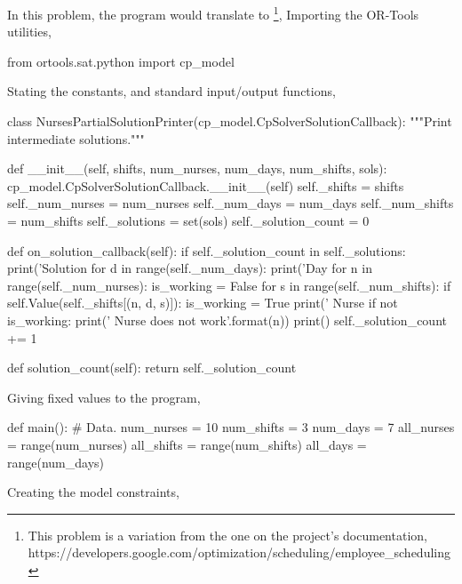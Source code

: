 \documentclass[
12pt,				%
openright,			%
oneside,			%
a4paper,			%
brazil,				%
english,			  %
]{abntex2}
\begin{document}
In this problem, the program would translate to \footnote{This problem
is a variation from the one on the project's documentation, https://developers.google.com/optimization/scheduling/employee_scheduling},
Importing the OR-Tools utilities,

\begin{python}
  from ortools.sat.python import cp_model
\end{python}

Stating the constants, and standard input/output functions,

\begin{python}
class NursesPartialSolutionPrinter(cp_model.CpSolverSolutionCallback):
    """Print intermediate solutions."""

    def __init__(self, shifts, num_nurses, num_days, num_shifts, sols):
        cp_model.CpSolverSolutionCallback.__init__(self)
        self._shifts = shifts
        self._num_nurses = num_nurses
        self._num_days = num_days
        self._num_shifts = num_shifts
        self._solutions = set(sols)
        self._solution_count = 0

    def on_solution_callback(self):
        if self._solution_count in self._solutions:
            print('Solution %
            for d in range(self._num_days):
                print('Day %
                for n in range(self._num_nurses):
                    is_working = False
                    for s in range(self._num_shifts):
                        if self.Value(self._shifts[(n, d, s)]):
                            is_working = True
                            print('  Nurse %
                    if not is_working:
                        print('  Nurse {} does not work'.format(n))
            print()
        self._solution_count += 1

    def solution_count(self):
        return self._solution_count
\end{python}

Giving fixed values to the program,

\begin{python}
def main():
    # Data.
    num_nurses = 10
    num_shifts = 3
    num_days = 7
    all_nurses = range(num_nurses)
    all_shifts = range(num_shifts)
    all_days = range(num_days)
\end{python}

Creating the model constraints,
\end{document}
